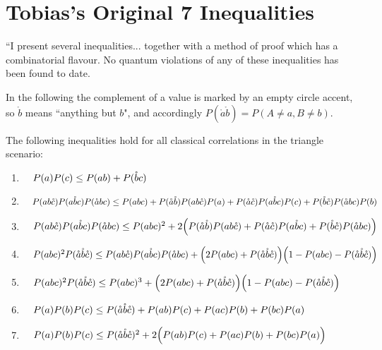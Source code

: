 \section{Tobias's Original 7 Inequalities}

``I present several inequalities... together with a method of proof which has a combinatorial flavour. No quantum violations of any of these inequalities has been found to date.

In the following the complement of a value is marked by an empty circle accent, so $\mathring{b}$ means ``anything but $b$", and accordingly $P(\mathring{a}\mathring{b})=P(A\mathopen{\neq}a,B\mathopen{\neq}b)$. 
\begin{theorem}
The following inequalities hold for all classical correlations in the triangle scenario:
\begin{enumerate}
\item
\(\quad
P(a) P(c)  \leq  P(a b) + P(\nb c)
\)
\item
\(\quad
P(a b\nc) P(a \nb c) P(\na b c) \leq P(a b c) + P(\na \nb) P(a b \nc) P(a) + P(\na\nc) P(a\nb c) P(c)  + P(\nb \nc) P(\na b c) P(b)
\)
\item 
\(\quad
P(a b\nc) P(a \nb c) P(\na b c) \leq P(a b c)^2 + 2\parens*{P(\na \nb) P(a b \nc) + P(\na\nc) P(a\nb c)  + P(\nb \nc) P(\na b c)}
\)
\item
\(\quad
P(a b c)^2 P(\na\nb\nc)  \leq  P(a b \nc) P(a \nb c) P(\na b c) + \parens*{2 P(a b c) + P(\na\nb\nc)} \parens*{1 - P(a b c) - P(\na\nb\nc)}
\)
\item
\(\quad
P(a b c)^2 P(\na\nb\nc)  \leq  P(a b c)^3 + \parens*{2 P(a b c) + P(\na\nb\nc)} \parens*{1 - P(a b c) - P(\na\nb\nc)}
\)
\item
\(\quad
P(a) P(b) P(c) \leq  P(\na\nb\nc) + P(a b) P(c) + P(a c) P(b) + P(b c) P(a)
\)
\item
\(\quad
P(a) P(b) P(c) \leq  P(\na\nb\nc)^2 +2\parens[\Big]{ P(a b) P(c) + P(a c) P(b) + P(b c) P(a) }
\)
\end{enumerate}
\end{theorem}

